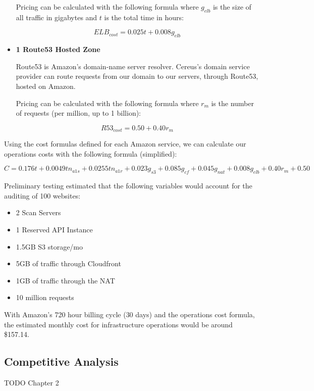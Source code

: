\begin{itemize}
Pricing can be calculated with the following formula where \( g_{elb} \) is the size of all traffic in gigabytes and \( t \) is the total time in hours:

\[ ELB_{cost} = 0.025t + 0.008g_{elb} \]

\item \textbf{1 Route53 Hosted Zone}

Route53 is Amazon's domain-name server resolver. Cereus's domain service provider can route requests from our domain to our servers, through Route53, hosted on Amazon.

Pricing can be calculated with the following formula where \( r_{m} \) is the number of requests (per million, up to 1 billion):

\[ R53_{cost} = 0.50 + 0.40r_{m} \]

\end{itemize}

\noindent
Using the cost formulas defined for each Amazon service, we can calculate our operations costs with the following formula (simplified):

\[
  C = 0.176t + 0.0049tn_{a1s} + 0.0255tn_{a1r} + 0.023g_{s3} + 0.085g_{cf} + 0.045g_{nat} + 0.008g_{elb} + 0.40r_{m} + 0.50
\]

\noindent
Preliminary testing estimated that the following variables would account for the auditing of 100 websites:

\begin{itemize}

\item 2 Scan Servers
\item 1 Reserved API Instance
\item 1.5GB S3 storage/mo
\item 5GB of traffic through Cloudfront
\item 1GB of traffic through the NAT
\item 10 million requests

\end{itemize}

\noindent
With Amazon's 720 hour billing cycle (30 days) \cite{aws.calc.2020} and the operations cost formula, the estimated monthly cost for infrastructure operations would be around \$157.14.

\subsection{Competitive Analysis}

TODO Chapter 2

